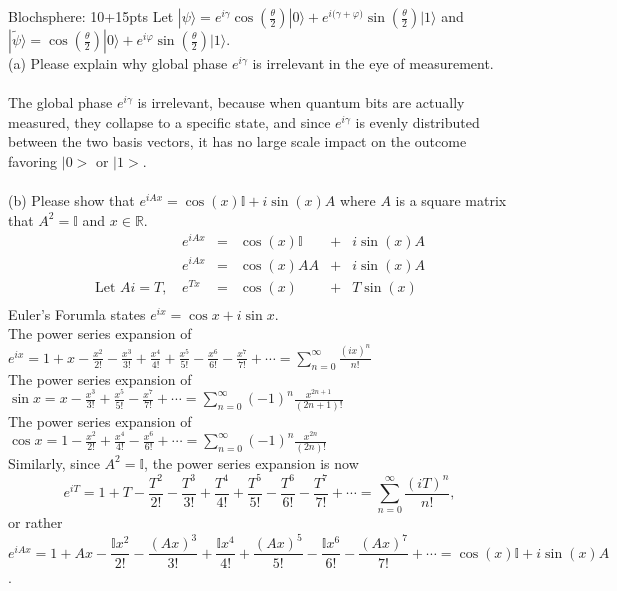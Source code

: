 \documentclass[12pt]{article}
\makeatletter
\newcommand{\<}{\langle}
\renewcommand{\>}{\rangle}
\newcommand{\kets}[1]{| #1 \rangle}                 %
\newenvironment{problem}{\@startsection
       {section}
       {1}
       {-.2em}
       {-3.5ex plus -1ex minus -.2ex}
       {2.3ex plus .2ex}
       {\pagebreak[3]
       \large\bf\noindent{Problem }
       }
       }
       {%
       \begin{center}\large\bf \end{center}}
\def\ket#1{\big|{#1}\big>}
\makeatother
\begin{document}
\begin{problem}{Blochsphere: 10+15pts}
Let $\kets{\psi} = e^{i\gamma} \cos{(\frac{\theta}{2})}\kets{0} + e^{i{(\gamma + \varphi})}\sin{(\frac{\theta}{2})} \kets{1}$ and $\kets{\tilde{\psi}} = \cos{(\frac{\theta}{2})}\kets{0} + e^{i\varphi}\sin{(\frac{\theta}{2})}\kets{1}$. \\
(a) Please explain why global phase $ e^{i\gamma}$ is irrelevant in the eye of measurement. \\ \\
The global phase $e^{i\gamma}$ is irrelevant, because when quantum bits are actually measured, they collapse to a specific state, and since $e^{i\gamma}$ is evenly distributed between the two basis vectors, it has no large scale impact on the outcome favoring $\ket{0}$ or $\ket{1}$.\\ \\
(b) Please show that $e^{iAx} = \cos(x) \mathbb{I} + i\sin(x)A$ where $A $ is a square matrix that $A^2 = \mathbb{I}$ and $x \in \mathbb{R}.$\\
$$\begin{array}{ccccccc}
&e^{iAx} &=& \cos(x) \mathbb{I} &+& i\sin(x)A\\
&e^{iAx} &=& \cos(x)AA &+& i\sin(x)A\\ 
\text{Let }Ai = T \text{, } &e^{Tx} &=& \cos(x) &+& T\sin(x)\\
\end{array}$$
Euler's Forumla states $e^{ix} = \cos x + i\sin x$.\\
The power series expansion of \\ \hspace*{2.42cm}$e^{ix} = 1 + x - \frac{x^2}{2!} - \frac{x^3}{3!} + \frac{x^4}{4!} + \frac{x^5}{5!} - \frac{x^6}{6!} - \frac{x^7}{7!} + \cdots = \sum\limits_{n = 0}^{\infty}\frac{(ix)^n}{n!}$\\
The power series expansion of $\sin x = x - \frac{x^3}{3!} + \frac{x^5}{5!} - \frac{x^7}{7!} + \cdots = \sum\limits_{n = 0}^{\infty}(-1)^n\frac{x^{2n+1}}{(2n+1)!}$\\
The power series expansion of $\cos x = 1 - \frac{x^2}{2!} + \frac{x^4}{4!} - \frac{x^6}{6!} + \cdots= \sum\limits_{n = 0}^{\infty}(-1)^n\frac{x^{2n}}{(2n)!}$\\ 
Similarly, since $A^2 = \mathbb{I}$, the power series expansion is now 
$$e^{iT} = 1 + T - \frac{T^2}{2!} - \frac{T^3}{3!} + \frac{T^4}{4!} + \frac{T^5}{5!} - \frac{T^6}{6!} - \frac{T^7}{7!} + \cdots = \sum\limits_{n = 0}^{\infty}\frac{(iT)^n}{n!},$$
or rather $$e^{iAx} = 1 + Ax - \frac{\mathbb{I}x^2}{2!} - \frac{(Ax)^3}{3!} + \frac{\mathbb{I}x^4}{4!} + \frac{(Ax)^5}{5!} - \frac{\mathbb{I}x^6}{6!} - \frac{(Ax)^7}{7!} + \cdots = \cos(x) \mathbb{I} + i\sin(x)A$$.
\end{problem}
\newpage
\end{document}
